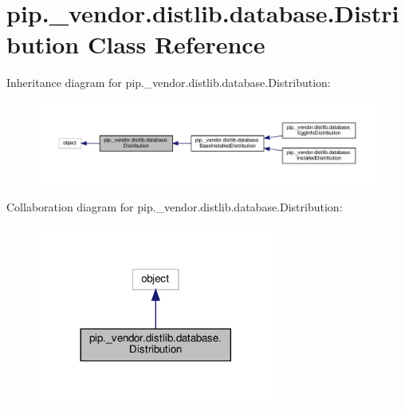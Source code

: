 \hypertarget{classpip_1_1__vendor_1_1distlib_1_1database_1_1Distribution}{}\section{pip.\+\_\+vendor.\+distlib.\+database.\+Distribution Class Reference}
\label{classpip_1_1__vendor_1_1distlib_1_1database_1_1Distribution}


Inheritance diagram for pip.\+\_\+vendor.\+distlib.\+database.\+Distribution\+:
\nopagebreak
\begin{figure}[H]
\begin{center}
\leavevmode
\includegraphics[width=350pt]{classpip_1_1__vendor_1_1distlib_1_1database_1_1Distribution__inherit__graph}
\end{center}
\end{figure}


Collaboration diagram for pip.\+\_\+vendor.\+distlib.\+database.\+Distribution\+:
\nopagebreak
\begin{figure}[H]
\begin{center}
\leavevmode
\includegraphics[width=221pt]{classpip_1_1__vendor_1_1distlib_1_1database_1_1Distribution__coll__graph}
\end{center}
\end{figure}
